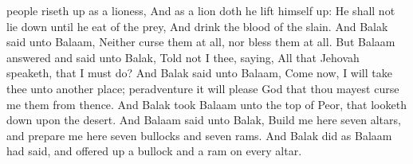 people riseth up as a lioness, And as a lion doth he lift himself up: He shall not lie down until he eat of the prey, And drink the blood of the slain.  And Balak said unto Balaam, Neither curse them at all, nor bless them at all. But Balaam answered and said unto Balak, Told not I thee, saying, All that Jehovah speaketh, that I must do?  And Balak said unto Balaam, Come now, I will take thee unto another place; peradventure it will please God that thou mayest curse me them from thence. And Balak took Balaam unto the top of Peor, that looketh down upon the desert. And Balaam said unto Balak, Build me here seven altars, and prepare me here seven bullocks and seven rams. And Balak did as Balaam had said, and offered up a bullock and a ram on every altar. 

